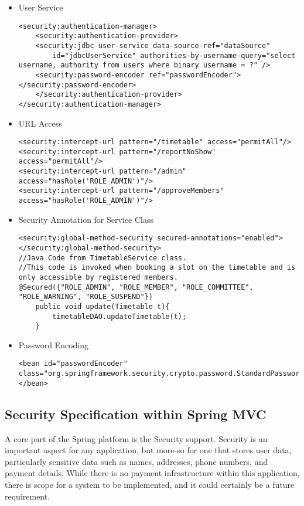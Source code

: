 \begin{itemize}
\item User Service
\begin{lstlisting}
<security:authentication-manager>	
	<security:authentication-provider>
	<security:jdbc-user-service data-source-ref="dataSource"
		id="jdbcUserService" authorities-by-username-query="select username, authority from users where binary username = ?" />
	<security:password-encoder ref="passwordEncoder"></security:password-encoder>
	</security:authentication-provider>
</security:authentication-manager>
\end{lstlisting}
\item URL Access
\begin{lstlisting}
<security:intercept-url pattern="/timetable" access="permitAll"/>
<security:intercept-url pattern="/reportNoShow" access="permitAll"/>
<security:intercept-url pattern="/admin" access="hasRole('ROLE_ADMIN')"/>
<security:intercept-url pattern="/approveMembers" access="hasRole('ROLE_ADMIN')"/>
\end{lstlisting}
\item Security Annotation for Service Class
\begin{lstlisting}
<security:global-method-security secured-annotations="enabled"></security:global-method-security>
//Java Code from TimetableService class. 
//This code is invoked when booking a slot on the timetable and is only accessible by registered members.
@Secured({"ROLE_ADMIN", "ROLE_MEMBER", "ROLE_COMMITTEE", "ROLE_WARNING", "ROLE_SUSPEND"})
	public void update(Timetable t){
		timetableDAO.updateTimetable(t);
	}
\end{lstlisting}
\item Password Encoding
\begin{lstlisting}
<bean id="passwordEncoder"
class="org.springframework.security.crypto.password.StandardPasswordEncoder">
</bean>
\end{lstlisting}
\end{itemize}

\subsection{Security Specification within Spring MVC}

A core part of the Spring platform is the Security support. Security is an important aspect for any application, but more-so for one that stores user data, particularly sensitive data such as names, addresses, phone numbers, and payment details. While there is no payment infrastructure within this application, there is scope for a system to be implemented, and it could certainly be a future requirement. 

